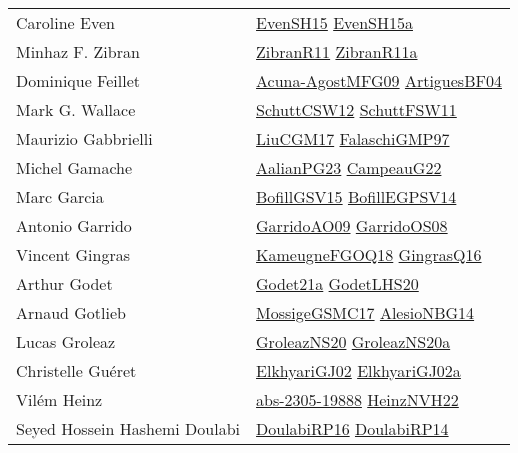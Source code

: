 {\begin{longtable}{p{4cm}p{20cm}}
Caroline Even & \href{papers/EvenSH15.pdf}{EvenSH15}\cite{EvenSH15} \href{articles/EvenSH15a.pdf}{EvenSH15a}\cite{EvenSH15a} \\
Minhaz F. Zibran & \href{papers/ZibranR11.pdf}{ZibranR11}\cite{ZibranR11} \href{papers/ZibranR11a.pdf}{ZibranR11a}\cite{ZibranR11a} \\
Dominique Feillet & \href{papers/Acuna-AgostMFG09.pdf}{Acuna-AgostMFG09}\cite{Acuna-AgostMFG09} \href{papers/ArtiguesBF04.pdf}{ArtiguesBF04}\cite{ArtiguesBF04} \\
Mark G. Wallace & \href{papers/SchuttCSW12.pdf}{SchuttCSW12}\cite{SchuttCSW12} \href{articles/SchuttFSW11.pdf}{SchuttFSW11}\cite{SchuttFSW11} \\
Maurizio Gabbrielli & \href{papers/LiuCGM17.pdf}{LiuCGM17}\cite{LiuCGM17} \href{articles/FalaschiGMP97.pdf}{FalaschiGMP97}\cite{FalaschiGMP97} \\
Michel Gamache & \href{papers/AalianPG23.pdf}{AalianPG23}\cite{AalianPG23} \href{articles/CampeauG22.pdf}{CampeauG22}\cite{CampeauG22} \\
Marc Garcia & \href{papers/BofillGSV15.pdf}{BofillGSV15}\cite{BofillGSV15} \href{papers/BofillEGPSV14.pdf}{BofillEGPSV14}\cite{BofillEGPSV14} \\
Antonio Garrido & \href{articles/GarridoAO09.pdf}{GarridoAO09}\cite{GarridoAO09} \href{articles/GarridoOS08.pdf}{GarridoOS08}\cite{GarridoOS08} \\
Vincent Gingras & \href{papers/KameugneFGOQ18.pdf}{KameugneFGOQ18}\cite{KameugneFGOQ18} \href{papers/GingrasQ16.pdf}{GingrasQ16}\cite{GingrasQ16} \\
Arthur Godet & \href{}{Godet21a}\cite{Godet21a} \href{papers/GodetLHS20.pdf}{GodetLHS20}\cite{GodetLHS20} \\
Arnaud Gotlieb & \href{papers/MossigeGSMC17.pdf}{MossigeGSMC17}\cite{MossigeGSMC17} \href{papers/AlesioNBG14.pdf}{AlesioNBG14}\cite{AlesioNBG14} \\
Lucas Groleaz & \href{papers/GroleazNS20.pdf}{GroleazNS20}\cite{GroleazNS20} \href{papers/GroleazNS20a.pdf}{GroleazNS20a}\cite{GroleazNS20a} \\
Christelle Gu{\'{e}}ret & \href{papers/ElkhyariGJ02.pdf}{ElkhyariGJ02}\cite{ElkhyariGJ02} \href{papers/ElkhyariGJ02a.pdf}{ElkhyariGJ02a}\cite{ElkhyariGJ02a} \\
Vil{\'{e}}m Heinz & \href{articles/abs-2305-19888.pdf}{abs-2305-19888}\cite{abs-2305-19888} \href{articles/HeinzNVH22.pdf}{HeinzNVH22}\cite{HeinzNVH22} \\
Seyed Hossein Hashemi Doulabi & \href{}{DoulabiRP16}\cite{DoulabiRP16} \href{papers/DoulabiRP14.pdf}{DoulabiRP14}\cite{DoulabiRP14} \\

\end{longtable}}
